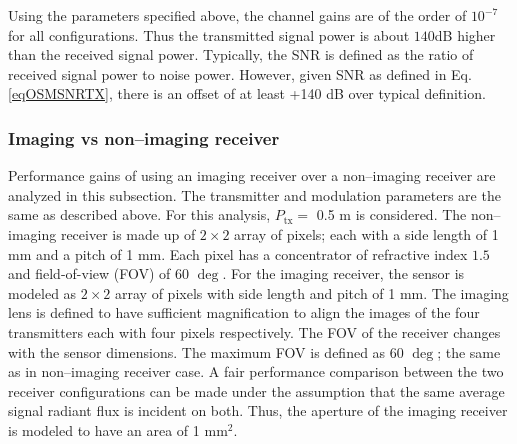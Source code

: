 Using the parameters specified above, the channel gains are of the order of $10^{-7}$ for all configurations. Thus the transmitted signal power is about $140$dB higher than the received signal power. Typically, the SNR is defined as the ratio of received signal power to noise power. However, given SNR as defined in Eq. \eqref{eqOSMSNRTX}, there is an offset of at least +140 dB over typical definition.

\subsubsection{Imaging vs non--imaging receiver}
\label{subsubsec:osmResultsCompare}
Performance gains of using an imaging receiver over a non--imaging receiver are analyzed in this subsection. The transmitter and modulation parameters are the same as described above. For this analysis, $P_{\text{tx}}=$ 0.5 m is considered. The non--imaging receiver is made up of $2\times2$ array of pixels; each with a side length of 1 mm and a pitch of 1 mm. Each pixel has a concentrator of refractive index $1.5$ and field-of-view (FOV) of 60 $\deg$. For the imaging receiver, the sensor is modeled as $2\times2$ array of pixels with side length and pitch of 1 mm. The imaging lens is defined to have sufficient magnification to align the images of the four transmitters each with four pixels respectively. 
The FOV of the receiver changes with the sensor dimensions. The maximum FOV is defined as 60 $\deg$; the same as in non--imaging receiver case. A fair performance comparison between the two receiver configurations can be made under the assumption that the same average signal radiant flux is incident on both. Thus, the aperture of the imaging receiver is modeled to have an area of  1 mm$^{2}$.

